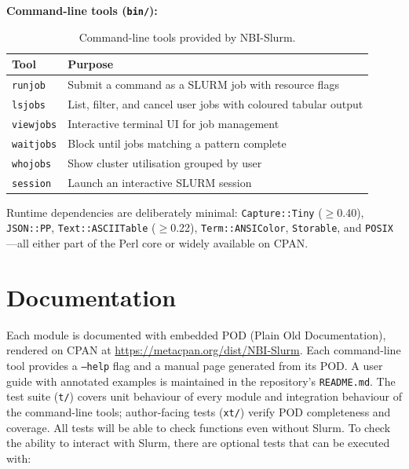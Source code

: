 \documentclass[11pt,a4paper]{article}
\begin{document}
\textbf{Command-line tools (\texttt{bin/}):}

\begin{table}[htbp]
  \centering
  \begin{tabular}{ll}
    \toprule
    \textbf{Tool}   & \textbf{Purpose} \\
    \midrule
    \texttt{runjob}   & Submit a command as a SLURM job with resource flags \\
    \texttt{lsjobs}   & List, filter, and cancel user jobs with coloured tabular output \\
    \texttt{viewjobs} & Interactive terminal UI for job management \\
    \texttt{waitjobs} & Block until jobs matching a pattern complete \\
    \texttt{whojobs}  & Show cluster utilisation grouped by user \\
    \texttt{session}  & Launch an interactive SLURM session \\
    \bottomrule
  \end{tabular}
  \caption{Command-line tools provided by NBI-Slurm.}
  \label{tab:tools}
\end{table}

Runtime dependencies are deliberately minimal: \texttt{Capture::Tiny} ($\geq$0.40),
\texttt{JSON::PP}, \texttt{Text::ASCIITable} ($\geq$0.22), \texttt{Term::ANSIColor},
\texttt{Storable}, and \texttt{POSIX}---all either part of the Perl core or widely available
on CPAN.

\section{Documentation}

Each module is documented with embedded POD (Plain Old Documentation), rendered on CPAN at
\url{https://metacpan.org/dist/NBI-Slurm}.
Each command-line tool provides a \texttt{--help} flag and a manual page generated from its
POD.
A user guide with annotated examples is maintained in the repository's \texttt{README.md}.
The test suite (\texttt{t/}) covers unit behaviour of every module and integration behaviour of
the command-line tools; author-facing tests (\texttt{xt/}) verify POD completeness and
coverage.
All tests will be able to check functions even without Slurm. To check the ability to interact
with Slurm, there are optional tests that can be executed with:
\end{document}
